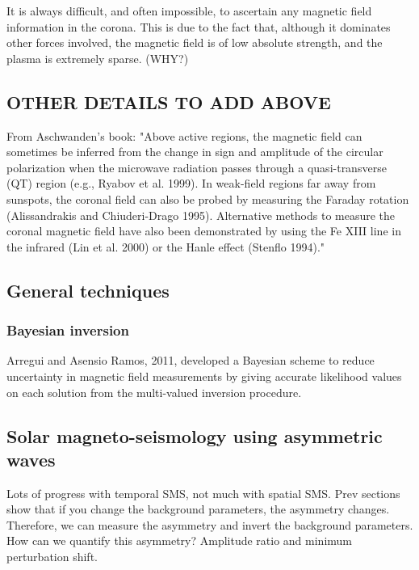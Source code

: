 \documentclass[12pt]{../style-files/ociamthesis}
\begin{document}
It is always difficult, and often impossible, to ascertain any magnetic field information in the corona. This is due to the fact that, although it dominates other forces involved, the magnetic field is of low absolute strength, and the plasma is extremely sparse. (WHY?)


\subsection{OTHER DETAILS TO ADD ABOVE}
From Aschwanden's book: "Above active regions, the magnetic field can sometimes be inferred from the change in sign and amplitude of the circular polarization when the microwave radiation passes through a quasi-transverse (QT) region (e.g., Ryabov et al. 1999). In weak-field regions far away from sunspots, the coronal field can also be probed by measuring the Faraday rotation (Alissandrakis  and Chiuderi-Drago 1995). Alternative methods to measure the coronal magnetic field have also been demonstrated by using the Fe XIII line in the infrared (Lin et al. 2000) or the Hanle effect (Stenflo 1994)."


\subsection{General techniques}
\subsubsection{Bayesian inversion}
Arregui and Asensio Ramos, 2011, developed a Bayesian scheme to reduce uncertainty in magnetic field measurements by giving accurate likelihood values on each solution from the multi-valued inversion procedure.


\subsection{Solar magneto-seismology using asymmetric waves}

Lots of progress with temporal SMS, not much with spatial SMS. Prev sections show that if you change the background parameters, the asymmetry changes. Therefore, we can measure the asymmetry and invert the background parameters. How can we quantify this asymmetry? Amplitude ratio and minimum perturbation shift.
\color{black}




  
\end{document}
